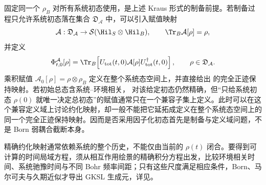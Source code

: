 固定同一个 $\rho_B$ 对所有系统初态使用，是上述 Kraus 形式的制备前提。若制备过程只允许系统初态落在集合 $\mathfrak D_{\mathcal A}$ 中，可以引入赋值映射
\begin{equation}
\mathcal A:\mathfrak D_{\mathcal A}\to\mathcal S(\Hil_S\otimes\Hil_B),
\qquad
\Tr_B\mathcal A[\rho]=\rho,
\label{eq:phys-oqs-assignment-map}
\end{equation}
并定义
\begin{equation}
\Phi_{t,0}^{\mathcal A}[\rho]
=\Tr_B\!\left[U_{\rm tot}(t,0)\mathcal A[\rho]U_{\rm tot}^\dagger(t,0)\right],
\qquad \rho\in\mathfrak D_{\mathcal A}.
\label{eq:phys-oqs-assignment-reduced-map}
\end{equation}
乘积赋值 $\mathcal A_0[\rho]=\rho\otimes\rho_B$ 定义在整个系统态空间上，并直接给出 的完全正迹保持映射。若初始总态含系统--环境相关， 对该给定初态仍然精确，但“只给系统初态 \(\rho(0)\) 就唯一决定总初态”的赋值通常只在一个兼容子集上定义。此时可以在这个兼容定义域上讨论约化映射，却一般不能把它延拓成定义在整个系统态空间上的同一个完全正迹保持映射。因而是否采用因子化初态首先是制备与定义域问题，不是 Born 弱耦合截断本身。

精确约化映射通常依赖系统的整个历史，不能仅由当前的 $\rho(t)$ 闭合。要得到可计算的时间局域方程，须从相互作用绘景的精确积分方程出发，比较环境相关时间、系统驰豫时间与不同 Bohr 频率间距；只有这些尺度满足相应条件，Born、马尔可夫与久期近似才导出 GKSL 生成元，详见。
